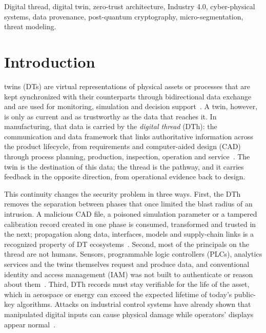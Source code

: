\documentclass[journal]{IEEEtran}
\begin{document}
\begin{IEEEkeywords}
Digital thread, digital twin, zero-trust architecture, Industry 4.0, cyber-physical systems, data provenance, post-quantum cryptography, micro-segmentation, threat modeling.
\end{IEEEkeywords}

\section{Introduction}
\label{sec:intro}
 twins (DTs) are virtual representations of physical assets or processes that are kept synchronized with their counterparts through bidirectional data exchange and are used for monitoring, simulation and decision support~\cite{grieves2017dt,kritzinger2018dt,tao2019dt}. A twin, however, is only as current and as trustworthy as the data that reaches it. In manufacturing, that data is carried by the \emph{digital thread} (DTh): the communication and data framework that links authoritative information across the product lifecycle, from requirements and computer-aided design (CAD) through process planning, production, inspection, operation and service~\cite{helu2017dth,singh2018dth,zhang2024dth}. The twin is the destination of this data; the thread is the pathway, and it carries feedback in the opposite direction, from operational evidence back to design.

This continuity changes the security problem in three ways. First, the DTh removes the separation between phases that once limited the blast radius of an intrusion. A malicious CAD file, a poisoned simulation parameter or a tampered calibration record created in one phase is consumed, transformed and trusted in the next; propagation along data, interfaces, models and supply-chain links is a recognized property of DT ecosystems~\cite{alcaraz2022dt,mun2025survey}. Second, most of the principals on the thread are not humans. Sensors, programmable logic controllers (PLCs), analytics services and the twins themselves request and produce data, and conventional identity and access management (IAM) was not built to authenticate or reason about them~\cite{wang2023iodt}. Third, DTh records must stay verifiable for the life of the asset, which in aerospace or energy can exceed the expected lifetime of today's public-key algorithms. Attacks on industrial control systems have already shown that manipulated digital inputs can cause physical damage while operators' displays appear normal~\cite{langner2011stuxnet,cardenas2008ctrl}.
\end{document}
